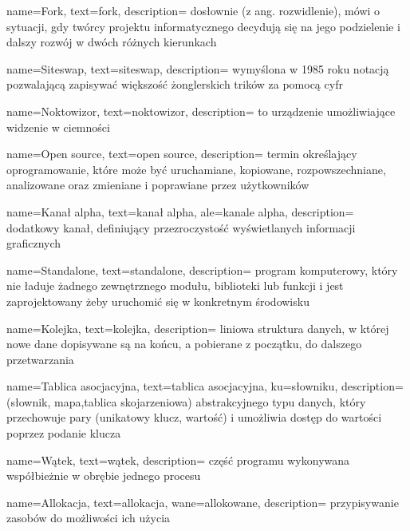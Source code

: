 {
    name={Fork},
    text={fork},
    description={
        dosłownie (z ang. rozwidlenie), mówi o sytuacji,
        gdy twórcy projektu informatycznego
        decydują się na jego podzielenie i dalszy rozwój
        w dwóch różnych kierunkach}
}

{
    name={Siteswap},
    text={siteswap},
    description={
        wymyślona w 1985 roku notacją pozwalającą
        zapisywać większość żonglerskich trików za pomocą cyfr}
}

{
    name={Noktowizor},
    text={noktowizor},
    description={
        to urządzenie umożliwiające widzenie w ciemności}
}

 {
     name={Open source},
     text={open source},
     description={
        termin określający oprogramowanie, które może być
        uruchamiane, kopiowane, rozpowszechniane, analizowane
        oraz zmieniane i poprawiane przez użytkowników}
 }

{
    name={Kanał alpha},
    text={kanał alpha},
    ale={kanale alpha},
    description={
    dodatkowy kanał, definiujący przezroczystość
    wyświetlanych informacji graficznych}
}

{
    name={Standalone},
    text={standalone},
    description={
      program komputerowy, który nie ładuje żadnego zewnętrznego
      modułu, biblioteki lub funkcji i jest zaprojektowany
      żeby uruchomić się w konkretnym środowisku}
}

  {
      name={Kolejka},
      text={kolejka},
      description={
        liniowa struktura danych, w której nowe dane
        dopisywane są na końcu, a pobierane z początku,
           do dalszego przetwarzania}
  }


 {
     name={Tablica asocjacyjna},
     text={tablica asocjacyjna},
     ku={słowniku},
     description={
         (słownik, mapa,tablica skojarzeniowa)
        abstrakcyjnego typu danych, który przechowuje
        pary (unikatowy klucz, wartość) i umożliwia
        dostęp do wartości poprzez podanie klucza}
 }

{
    name={Wątek},
    text={wątek},
    description={
        część programu wykonywana współbieżnie
        w obrębie jednego procesu}
}

{
    name={Allokacja},
    text={allokacja},
    wane={allokowane},
    description={
        przypisywanie zasobów do możliwości ich użycia}
}


